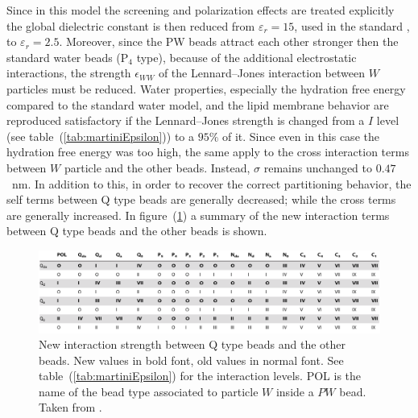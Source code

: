 Since in this model the screening and polarization effects are treated explicitly the global dielectric constant
is then reduced from $\varepsilon_r = 15$, used in the standard \martini, to $\varepsilon_r = 2.5$. Moreover,
since the \ac{PW} beads attract each other stronger then the standard water beads (P$_4$ type), because of the additional electrostatic interactions, the strength $\epsilon_{WW}$ of the Lennard--Jones interaction between $W$ particles must be reduced. Water properties, especially the hydration free energy compared to the standard water model, and the lipid membrane behavior are reproduced satisfactory if the Lennard--Jones strength is changed from a
$I$ level (see table~(\ref{tab:martiniEpsilon})) to a $95\% $ of it. Since even in this case the hydration free energy was too high, the same apply to the cross interaction terms between $W$ particle and the other \martini beads. Instead, $\sigma$ remains unchanged to $0.47$~nm. In addition to this, in order to recover the correct partitioning behavior, the self terms between Q type beads are generally decreased; while the cross terms are generally increased. In figure~(\ref{fig:PWMartini}) a summary of the new interaction terms between Q type beads and the other beads is shown.
\begin{figure}[!ht]
	\centering
	\includegraphics[width=\textwidth]{./img/PWMartini}
	\caption{New interaction strength between Q type beads and the other beads. New values in bold font, old values in normal font. See table~(\ref{tab:martiniEpsilon}) for the interaction levels. POL is the name of the \martini bead type associated to particle $W$ inside a $PW$ bead. Taken from \cite{PW}.}
	\label{fig:PWMartini}
\end{figure}

